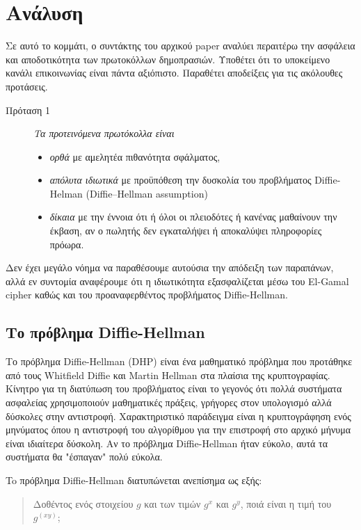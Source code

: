 \documentclass[letterpaper,11pt]{article}
\begin{document}
\section{Ανάλυση}

Σε αυτό το κομμάτι, ο συντάκτης του αρχικού paper αναλύει περαιτέρω την ασφάλεια και αποδοτικότητα των πρωτοκόλλων δημοπρασιών. Υποθέτει ότι το
υποκείμενο κανάλι επικοινωνίας είναι πάντα αξιόπιστο. Παραθέτει αποδείξεις για τις ακόλουθες προτάσεις.

\begin{description}
	\item[Πρόταση 1] \emph{Τα προτεινόμενα πρωτόκολλα είναι}
		\begin{itemize}
			\item \emph{ορθά} με αμελητέα πιθανότητα σφάλματος,
			\item \emph{απόλυτα ιδιωτικά} με προϋπόθεση την δυσκολία του προβλήματος Diffie-Helman (Diffie–Hellman assumption) 
			\item \emph{δίκαια} με την έννοια ότι ή όλοι οι πλειοδότες ή κανένας μαθαίνουν την έκβαση, αν ο πωλητής δεν εγκαταλήψει ή αποκαλύψει
			πληροφορίες πρόωρα.
		\end{itemize}
\end{description}

Δεν έχει μεγάλο νόημα να παραθέσουμε αυτούσια την απόδειξη των παραπάνων, αλλά εν συντομία αναφέρουμε ότι η ιδιωτικότητα εξασφαλίζεται μέσω του
El-Gamal cipher καθώς και του προαναφερθέντος προβλήματος Diffie-Hellman.

\subsection{Το πρόβλημα Diffie-Hellman}

Το πρόβλημα Diffie-Hellman (DHP) είναι ένα μαθηματικό πρόβλημα που προτάθηκε από τους Whitfield Diffie και Martin Hellman στα πλαίσια της
κρυπτογραφίας. Κίνητρο για τη διατύπωση του προβλήματος είναι το γεγονός ότι πολλά συστήματα ασφαλείας χρησιμοποιούν μαθηματικές πράξεις, γρήγορες
στον υπολογισμό αλλά δύσκολες στην αντιστροφή. Χαρακτηριστικό παράδειγμα είναι η κρυπτογράφηση ενός μηνύματος όπου η αντιστροφή του αλγορίθμου για
την επιστροφή στο αρχικό μήνυμα είναι ιδιαίτερα δύσκολη. Αν το πρόβλημα Diffie-Hellman ήταν εύκολο, αυτά τα συστήματα θα "έσπαγαν" πολύ εύκολα.

To πρόβλημα Diffie-Hellman διατυπώνεται ανεπίσημα ως εξής:

 \begin{quote} Δοθέντος ενός στοιχείου $g$ και των τιμών $g^x$ και $g^y$, ποιά είναι η τιμή του $g^(xy)$; \end{quote}
\end{document}

